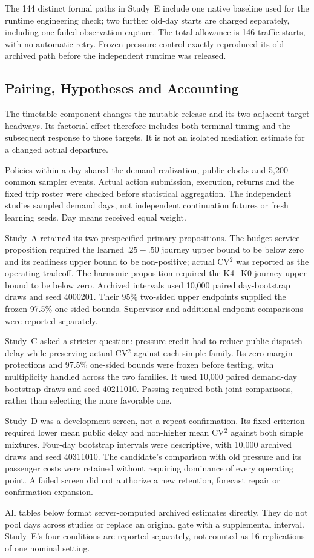 The 144 distinct formal paths in Study~E include one native baseline used for the runtime engineering check; two further old-day starts are charged separately, including one failed observation capture. The total allowance is 146 traffic starts, with no automatic retry. Frozen pressure control exactly reproduced its old archived path before the independent runtime was released.

\subsection{Pairing, Hypotheses and Accounting}
The timetable component changes the mutable release and its two adjacent target headways. Its factorial effect therefore includes both terminal timing and the subsequent response to those targets. It is not an isolated mediation estimate for a changed actual departure.

Policies within a day shared the demand realization, public clocks and 5,200 common sampler events. Actual action submission, execution, returns and the fixed trip roster were checked before statistical aggregation. The independent studies sampled demand days, not independent continuation futures or fresh learning seeds. Day means received equal weight.

Study~A retained its two prespecified primary propositions. The budget-service proposition required the learned $.25-.50$ journey upper bound to be below zero and its readiness upper bound to be non-positive; actual CV$^2$ was reported as the operating tradeoff. The harmonic proposition required the K4$-$K0 journey upper bound to be below zero. Archived intervals used 10,000 paired day-bootstrap draws and seed 4000201. Their 95\% two-sided upper endpoints supplied the frozen 97.5\% one-sided bounds. Supervisor and additional endpoint comparisons were reported separately.

Study~C asked a stricter question: pressure credit had to reduce public dispatch delay while preserving actual CV$^2$ against each simple family. Its zero-margin protections and 97.5\% one-sided bounds were frozen before testing, with multiplicity handled across the two families. It used 10,000 paired demand-day bootstrap draws and seed 40211010. Passing required both joint comparisons, rather than selecting the more favorable one.

Study~D was a development screen, not a repeat confirmation. Its fixed criterion required lower mean public delay and non-higher mean CV$^2$ against both simple mixtures. Four-day bootstrap intervals were descriptive, with 10,000 archived draws and seed 40311010. The candidate's comparison with old pressure and its passenger costs were retained without requiring dominance of every operating point. A failed screen did not authorize a new retention, forecast repair or confirmation expansion.

All tables below format server-computed archived estimates directly. They do not pool days across studies or replace an original gate with a supplemental interval. Study~E's four conditions are reported separately, not counted as 16 replications of one nominal setting.
